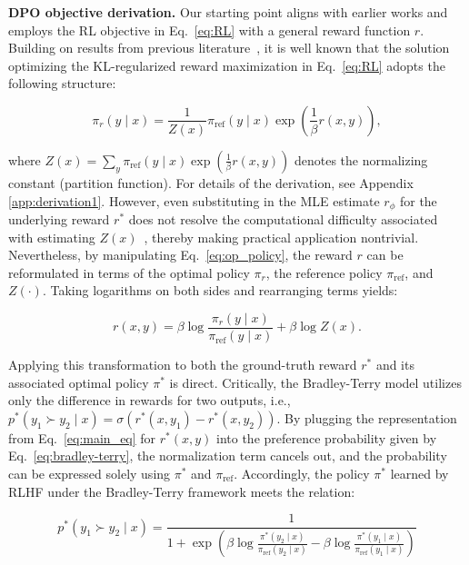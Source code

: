 \textbf{DPO objective derivation.} Our starting point aligns with earlier works and employs the RL objective in Eq.~\ref{eq:RL} with a general reward function $r$. Building on results from previous literature~\citep{peters2007reinforcement, peng2019advantage, korbak2022reinforcement, go2023aligning}, it is well known that the solution optimizing the KL-regularized reward maximization in Eq.~\ref{eq:RL} adopts the following structure:

\begin{equation}\label{eq:op_policy}
    \pi_r(y\mid x) = \frac{1}{Z(x)}\pi_\text{ref}(y\mid x)\exp\left(\frac{1}{\beta}r(x, y)\right),
\end{equation}

where $Z(x) =\sum_{y}\pi_\text{ref}(y\mid x)\exp\left(\frac{1}{\beta}r(x, y)\right)$ denotes the normalizing constant (partition function). For details of the derivation, see Appendix \ref{app:derivation1}. However, even substituting in the MLE estimate $r_{\phi}$ for the underlying reward $r^*$ does not resolve the computational difficulty associated with estimating $Z(x)$~\citep{korbak2022reinforcement, go2023aligning}, thereby making practical application nontrivial. Nevertheless, by manipulating Eq.~\ref{eq:op_policy}, the reward $r$ can be reformulated in terms of the optimal policy $\pi_r$, the reference policy $\pi_\text{ref}$, and $Z(\cdot)$. Taking logarithms on both sides and rearranging terms yields:

\begin{equation}\label{eq:main_eq}
    r(x,y) =\beta \log \frac{\pi_r(y\mid x)}{\pi_\text{ref}(y\mid x)} + \beta \log Z(x).
\end{equation}

Applying this transformation to both the ground-truth reward $r^*$ and its associated optimal policy $\pi^*$ is direct. Critically, the Bradley-Terry model utilizes only the difference in rewards for two outputs, i.e., ${p^*(y_1 \succ y_2 \mid x) = \sigma(r^*(x, y_1) - r^*(x, y_2))}$. By plugging the representation from Eq.~\ref{eq:main_eq} for $r^*(x,y)$ into the preference probability given by Eq.~\ref{eq:bradley-terry}, the normalization term cancels out, and the probability can be expressed solely using $\pi^*$ and $\pi_\text{ref}$. Accordingly, the policy $\pi^*$ learned by RLHF under the Bradley-Terry framework meets the relation:

\begin{equation}\label{eq:objective}
    p^*(y_1\succ y_2 \mid x)=\frac{1}{1 + \exp\left(\beta \log \frac{\pi^*(y_2\mid x)}{\pi_\text{ref}(y_2\mid x)} - \beta \log \frac{\pi^*(y_1\mid x)}{\pi_\text{ref}(y_1\mid x)}\right)}
\end{equation}


